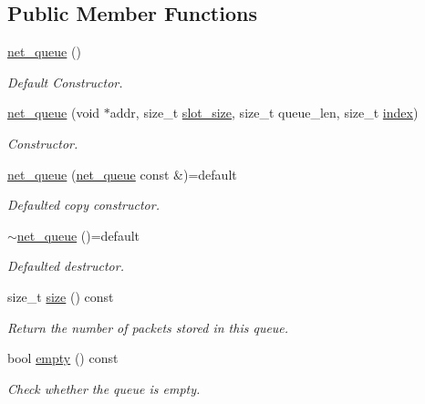 \subsection*{Public Member Functions}
\begin{DoxyCompactItemize}
\item 
\hyperlink{classpfq_1_1net__queue_a1306ad9a1587c85ac3bafc552667a578}{net\+\_\+queue} ()
\begin{DoxyCompactList}\small\item\em Default Constructor. \end{DoxyCompactList}\item 
\hyperlink{classpfq_1_1net__queue_a3e98f8f2ae6dfd4a0e7d28734601d307}{net\+\_\+queue} (void $\ast$addr, size\+\_\+t \hyperlink{classpfq_1_1net__queue_a29b652b2c4e672bdfe65709483ad4319}{slot\+\_\+size}, size\+\_\+t queue\+\_\+len, size\+\_\+t \hyperlink{classpfq_1_1net__queue_a6f328cf50f038056f2b761bfaeca4c91}{index})
\begin{DoxyCompactList}\small\item\em Constructor. \end{DoxyCompactList}\item 
\hyperlink{classpfq_1_1net__queue_a71df078739d1e6a0817ac8bde9fa6f7a}{net\+\_\+queue} (\hyperlink{classpfq_1_1net__queue}{net\+\_\+queue} const \&)=default
\begin{DoxyCompactList}\small\item\em Defaulted copy constructor. \end{DoxyCompactList}\item 
\hyperlink{classpfq_1_1net__queue_a87fd3585cac30773e7f5ff6951e74957}{$\sim$net\+\_\+queue} ()=default
\begin{DoxyCompactList}\small\item\em Defaulted destructor. \end{DoxyCompactList}\item 
size\+\_\+t \hyperlink{classpfq_1_1net__queue_a09cfe8a0ca2c9d11191ce9a8186adedd}{size} () const
\begin{DoxyCompactList}\small\item\em Return the number of packets stored in this queue. \end{DoxyCompactList}\item 
bool \hyperlink{classpfq_1_1net__queue_a3fa7bba9db8d43916404868573676d25}{empty} () const
\begin{DoxyCompactList}\small\item\em Check whether the queue is empty. \end{DoxyCompactList}\item 

\end{DoxyCompactItemize}
